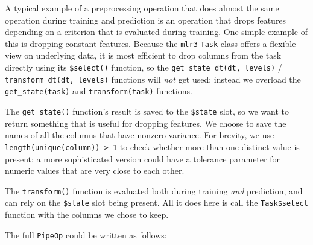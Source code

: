 \documentclass[12pt,]{scrbook}
\begin{document}
A typical example of a preprocessing operation that does almost the same operation during training and prediction is an operation that drops features depending on a criterion that is evaluated during training.
One simple example of this is dropping constant features.
Because the \texttt{mlr3} \texttt{Task} class offers a flexible view on underlying data, it is most efficient to drop columns from the task directly using its \texttt{\$select()} function, so the \texttt{get\_state\_dt(dt,\ levels)} / \texttt{transform\_dt(dt,\ levels)} functions will \emph{not} get used; instead we overload the \texttt{get\_state(task)} and \texttt{transform(task)} functions.

The \texttt{get\_state()} function's result is saved to the \texttt{\$state} slot, so we want to return something that is useful for dropping features.
We choose to save the names of all the columns that have nonzero variance.
For brevity, we use \texttt{length(unique(column))\ \textgreater{}\ 1} to check whether more than one distinct value is present; a more sophisticated version could have a tolerance parameter for numeric values that are very close to each other.

The \texttt{transform()} function is evaluated both during training \emph{and} prediction, and can rely on the \texttt{\$state} slot being present.
All it does here is call the \texttt{Task\$select} function with the columns we chose to keep.

The full \texttt{PipeOp} could be written as follows:
\end{document}
